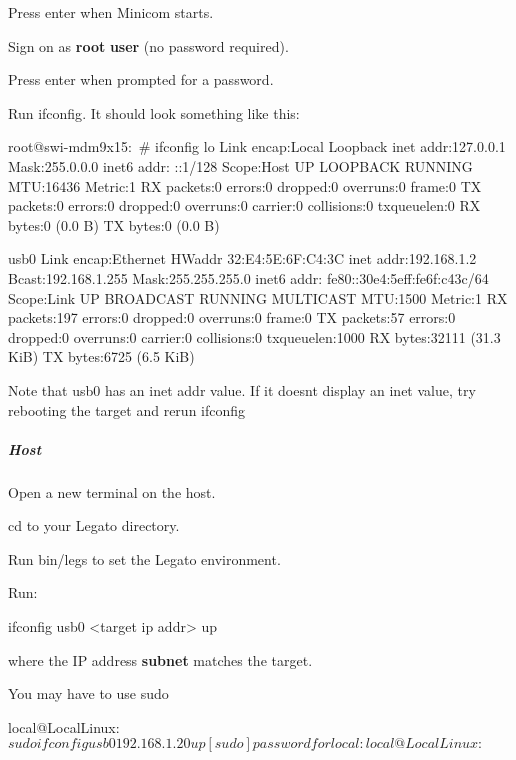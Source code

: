 Press enter when Minicom starts.

Sign on as {\bfseries root} {\bfseries user} (no password required).

Press enter when prompted for a password.

Run {\ttfamily ifconfig}. It should look something like this\+:

\begin{DoxyVerb}root@swi-mdm9x15:~# ifconfig
lo        Link encap:Local Loopback
          inet addr:127.0.0.1  Mask:255.0.0.0
          inet6 addr: ::1/128 Scope:Host
          UP LOOPBACK RUNNING  MTU:16436  Metric:1
          RX packets:0 errors:0 dropped:0 overruns:0 frame:0
          TX packets:0 errors:0 dropped:0 overruns:0 carrier:0
          collisions:0 txqueuelen:0
          RX bytes:0 (0.0 B)  TX bytes:0 (0.0 B)

usb0      Link encap:Ethernet  HWaddr 32:E4:5E:6F:C4:3C
          inet addr:192.168.1.2  Bcast:192.168.1.255  Mask:255.255.255.0
          inet6 addr: fe80::30e4:5eff:fe6f:c43c/64 Scope:Link
          UP BROADCAST RUNNING MULTICAST  MTU:1500  Metric:1
          RX packets:197 errors:0 dropped:0 overruns:0 frame:0
          TX packets:57 errors:0 dropped:0 overruns:0 carrier:0
          collisions:0 txqueuelen:1000
          RX bytes:32111 (31.3 KiB)  TX bytes:6725 (6.5 KiB)
\end{DoxyVerb}


Note that usb0 has an inet addr value. If it doesn\textquotesingle{}t display an inet value, try rebooting the target and rerun {\ttfamily ifconfig} \hypertarget{getstarted_config_i_pusb_getstartedConfigIPusb_host}{}\subparagraph{Host}\label{getstarted_config_i_pusb_getstartedConfigIPusb_host}
Open a new terminal on the host.

{\ttfamily cd} to your Legato directory.

Run {\ttfamily bin/legs} to set the Legato environment.

Run\+: 
\begin{DoxyCode}
ifconfig usb0 <target ip addr> up 
\end{DoxyCode}


where the I\+P address {\bfseries subnet} matches the target.

You may have to use {\ttfamily sudo} 

\begin{DoxyVerb}local@LocalLinux:~$ sudo ifconfig usb0 192.168.1.20 up
[sudo] password for local:
local@LocalLinux:~$
\end{DoxyVerb}


